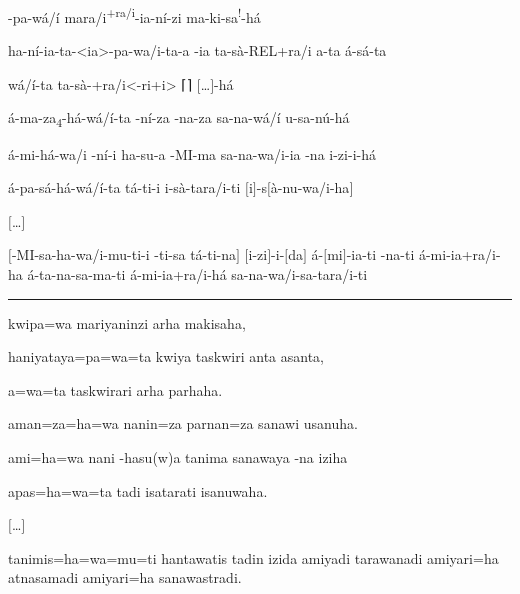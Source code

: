 \clearpage
\setcounter{parcount}{10}
\begin{parnumbersr}

	\raggedright%
	\itshape%


	-pa-wá/í \lmasc{}mara/i\textsuperscript{+ra/i}-ia-ní-zi
	\lmasc{} \lmasc{}ma-ki-sa\textsuperscript{!}-há \lmasc{}\lmasc{}


	\lmasc{}ha-ní-ia-ta-<ia>-pa-wa/i-ta-a \lmasc{}-ia
	\lmasc{}ta-sà-REL+ra/i \lmasc{}a-ta \lmasc{}á-sá-ta


	\lmasc{}wá/í-ta ta-sà-+ra/i<-ri+i>
	 \lmasc{}\textsc{⌈}\textsc{⌉} $[$…$]$-há

	\lmasc{}á-ma\lmasc{}\lmasc{}-za\textsubscript{4}-há-wá/í-ta
	\lmasc{}-ní-za
	\lmasc{}-na-za \lmasc{}sa-na-wá/í
	\lmasc{}u-sa-nú-há

	\lmasc{}á-mi-há-wa/i \lmasc{}-ní-i
	\lmasc{}ha-su-a \lmasc{}-MI-ma
	\lmasc{}\lmasc{} sa-na-wa/i-ia
	\lmasc{}-na i-zi-i-há

	\lmasc{}á-pa-sá-há-wá/í-ta \lmasc{}tá-ti-i
	\lmasc{}i-sà-tara/i-ti
	\lmasc{}$[$i$]$-s$[$à-nu-wa/i-ha$]$

	$[$\ldots$]$

	$[$\lmasc{}-MI-sa-ha-wa/i-mu-ti-i -ti-sa
					\lmasc{}tá-ti-na$]$ \lmasc{}$[$i-zi$]$-i-$[$da$]$
	\lmasc{}á-$[$mi$]$-ia-ti
	\lmasc{}-na-ti \lmasc{}á-mi-ia+ra/i-ha
	\lmasc{}á-ta-na-sa-ma-ti \lmasc{}á-mi-ia+ra/i-há
	\lmasc{}\lmasc{} \lmasc{}sa-na-wa/i-sa-tara/i-ti



\end{parnumbersr}

\vspace{10pt}
\hrule
\vspace{10pt}

\setcounter{parcount}{10}
\begin{parnumbersr}

	\raggedright%
	\itshape%

	kwipa=wa mariyaninzi arha makisaha,

	haniyataya=pa=wa=ta kwiya taskwiri anta asanta,

	a=wa=ta taskwirari arha parhaha.

	aman=za=ha=wa nanin=za parnan=za sanawi usanuha.

	ami=ha=wa nani -hasu{(w)}a tanima sanawaya -na iziha

	apas=ha=wa=ta tadi isatarati isanuwaha.

	$[$\ldots{}$]$

	tanimis=ha=wa=mu=ti hantawatis tadin izida amiyadi tarawanadi amiyari=ha
	atnasamadi amiyari=ha sanawastradi.

\end{parnumbersr}

